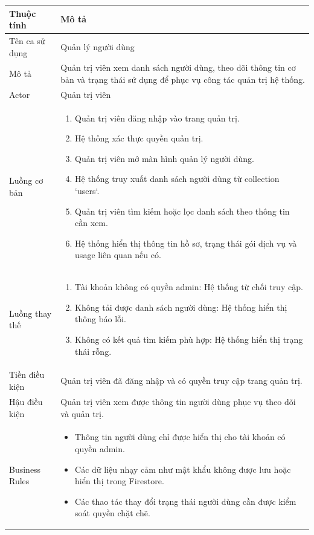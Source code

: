 \begin{longtable}{|p{4cm}|p{11cm}|}
    \hline
    \textbf{Thuộc tính} & \textbf{Mô tả} \\
    \hline
    \endhead
    \hline
    \endfoot
    Tên ca sử dụng & Quản lý người dùng \\
    \hline
    Mô tả & Quản trị viên xem danh sách người dùng, theo dõi thông tin cơ bản và trạng thái sử dụng để phục vụ công tác quản trị hệ thống. \\
    \hline
    Actor & Quản trị viên \\
    \hline
    Luồng cơ bản &
        \begin{enumerate}[nosep]
            \item Quản trị viên đăng nhập vào trang quản trị.
            \item Hệ thống xác thực quyền quản trị.
            \item Quản trị viên mở màn hình quản lý người dùng.
            \item Hệ thống truy xuất danh sách người dùng từ collection `users`.
            \item Quản trị viên tìm kiếm hoặc lọc danh sách theo thông tin cần xem.
            \item Hệ thống hiển thị thông tin hồ sơ, trạng thái gói dịch vụ và usage liên quan nếu có.
        \end{enumerate} \\
    \hline
    Luồng thay thế &
        \begin{enumerate}[nosep]
            \item[2a.] Tài khoản không có quyền admin: Hệ thống từ chối truy cập.
            \item[4a.] Không tải được danh sách người dùng: Hệ thống hiển thị thông báo lỗi.
            \item[5a.] Không có kết quả tìm kiếm phù hợp: Hệ thống hiển thị trạng thái rỗng.
        \end{enumerate} \\
    \hline
    Tiền điều kiện & Quản trị viên đã đăng nhập và có quyền truy cập trang quản trị. \\
    \hline
    Hậu điều kiện & Quản trị viên xem được thông tin người dùng phục vụ theo dõi và quản trị. \\
    \hline
    Business Rules &
        \begin{itemize}[nosep]
            \item Thông tin người dùng chỉ được hiển thị cho tài khoản có quyền admin.
            \item Các dữ liệu nhạy cảm như mật khẩu không được lưu hoặc hiển thị trong Firestore.
            \item Các thao tác thay đổi trạng thái người dùng cần được kiểm soát quyền chặt chẽ.
        \end{itemize} \\
    \hline
\end{longtable}


